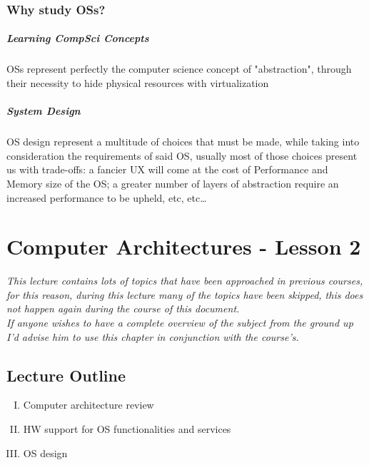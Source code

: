 \documentclass[openright, twoside]{report}
\theoremstyle{definition}
\theoremstyle{example}
\begin{document}
	\subsection{Why study OSs?}
	\paragraph{Learning CompSci Concepts} OSs represent perfectly the computer science concept of "abstraction", through
	their necessity to hide physical resources with virtualization

	\paragraph{System Design} OS design represent a multitude of choices that must be made, while taking into
	consideration the requirements of said OS, usually most of those choices present us with trade-offs: a fancier UX
	will come at the cost of Performance and Memory size of the OS; a greater number of layers of abstraction require an
	increased performance to be upheld, etc, etc\dots

\chapter{Computer Architectures - Lesson 2}

\begin{center}
        
    \textit{\small This lecture contains lots of topics that have been approached in previous courses,
	for this reason, during this lecture many of the topics have been skipped, this \emph{does not} happen again 
	during the course of this document.}\\
	
	\textit{\small If anyone wishes to have a complete overview of the subject from the ground up I'd advise him to use this chapter 
	in conjunction with the course's.
	}
	    
    \end{center}

	\section{Lecture Outline}
	\begin{enumerate}[I.]
		\item Computer architecture review
		\item HW support for OS functionalities and services
		\item OS design
	\end{enumerate}
\end{document}
